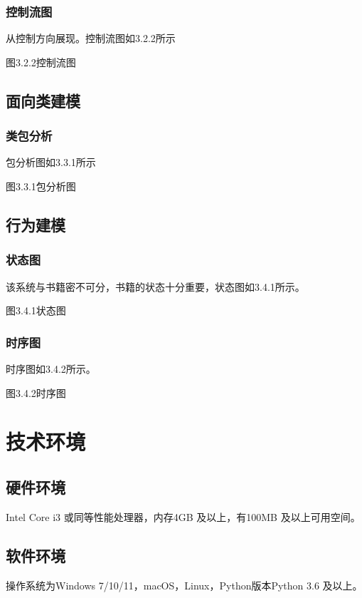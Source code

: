 \documentclass[UTF-8]{ctexart}
\begin{document}
\subsubsection{控制流图}
从控制方向展现。控制流图如3.2.2所示
\begin{center}
图3.2.2控制流图
\end{center}

\subsection{面向类建模}
\subsubsection{类包分析}
包分析图如3.3.1所示
\begin{center}
图3.3.1包分析图
\end{center}

\subsection{行为建模}
\subsubsection{状态图}
该系统与书籍密不可分，书籍的状态十分重要，状态图如3.4.1所示。
\begin{center}
图3.4.1状态图
\end{center}

\subsubsection{时序图}
时序图如3.4.2所示。
\begin{center}
图3.4.2时序图
\end{center}

\section{技术环境}
\subsection{硬件环境}
Intel Core i3 或同等性能处理器，内存4GB 及以上，有100MB 及以上可用空间。

\subsection{软件环境}
操作系统为Windows 7/10/11，macOS，Linux，Python版本Python 3.6 及以上。
\end{document}
